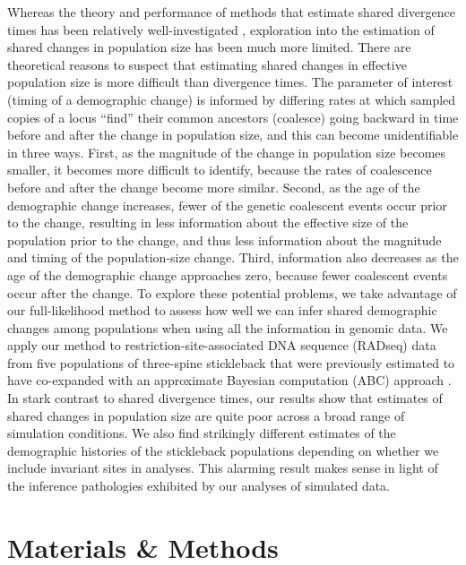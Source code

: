 Whereas the theory and performance of methods that estimate shared divergence
times has been relatively well-investigated
\citep[e.g.,][]{Oaks2012,Hickerson2013,Oaks2014reply,Oaks2014dpp,Overcast2017,Oaks2018ecoevolity},
exploration into the estimation of shared changes in population size has been
much more limited.
There are theoretical reasons to suspect that estimating shared changes in
effective population size is more difficult than divergence times.
The parameter of interest (timing of a demographic change) is informed by
differing rates at which sampled copies of a locus ``find'' their common
ancestors (coalesce) going backward in time before and after the change in
population size, and this can become unidentifiable in three ways.
First, as the magnitude of the change in population size becomes smaller, it
becomes more difficult to identify, because the rates of coalescence before and
after the change become more similar.
Second, as the age of the demographic change increases, fewer of the genetic
coalescent events occur prior to the change, resulting in less information
about the effective size of the population prior to the change, and thus less
information about the magnitude and timing of the population-size change.
Third, information also decreases as the age of the demographic change
approaches zero, because fewer coalescent events occur after the change.
To explore these potential problems, we take advantage of our full-likelihood
method to assess how well we can infer shared demographic changes among
populations when using all the information in genomic data.
We apply our method to restriction-site-associated DNA sequence (RADseq) data
from five populations of three-spine stickleback
\citep[;][]{Hohenlohe2010}
that were previously estimated to have co-expanded with an approximate Bayesian
computation (ABC) approach \citep{Xue2015}.
In stark contrast to shared divergence times, our results show that estimates
of shared changes in population size are quite poor across a broad range of 
simulation conditions.
We also find strikingly different estimates of the demographic histories of the
stickleback populations depending on whether we include invariant sites in
analyses.
This alarming result makes sense in light of the inference pathologies
exhibited by our analyses of simulated data.

\ifembed{

}{}



\section{Materials \& Methods}

